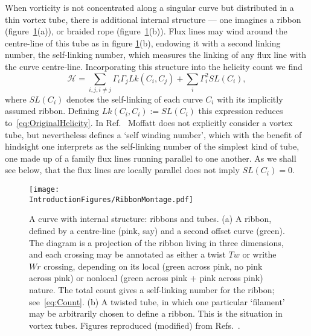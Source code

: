 When vorticity is not concentrated along a singular curve but distributed in a thin vortex tube, there is additional internal structure --- one imagines a ribbon (figure~\ref{fig:RibbonMontage}(a)), or braided rope (figure~\ref{fig:RibbonMontage}(b)). Flux lines may wind around the centre-line of this tube as in figure \ref{fig:RibbonMontage}(b), endowing it with a second linking number, the self-linking number, which measures the linking of any flux line with the curve centre-line. Incorporating this structure into the helicity count we find \citep{Moffat1992}
\begin{equation}
    \mathcal{H} = \sum_{i,j, i\neq j}\Gamma_i \Gamma_j  Lk(C_i,C_j) + \sum_{i} \Gamma_i^2 SL(C_i), 
    \label{eq:HelicityCount}
\end{equation}
where $SL(C_i)$ denotes the self-linking of each curve $C_i$ with its implicitly assumed ribbon. Defining $Lk(C_i,C_i) := SL(C_i)$ this expression reduces to~\eqref{eq:OriginalHelicity}. In Ref.~\citep{Moffatt1969} Moffatt does not explicitly consider a vortex tube, but nevertheless defines a `self winding number', which with the benefit of hindsight one interprets as the self-linking number of the simplest kind of tube, one made up of a family flux lines running parallel to one another. As we shall see below, that the flux lines are locally parallel does not imply $SL(C_i) = 0$.
\begin{figure}[htbp]
\centering
\texttt{[image: \\IntroductionFigures/RibbonMontage.pdf]}
\caption{A curve with internal structure: ribbons and tubes. (a) A ribbon, defined by a centre-line (pink, say) and a second offset curve (green). The diagram is a projection of the ribbon living in three dimensions, and each crossing may be annotated as either a twist $Tw$ or writhe $Wr$ crossing, depending on its local (green across pink, no pink across pink) or nonlocal (green across pink + pink across pink) nature. The total count gives a self-linking number for the ribbon; see~\eqref{eq:Count}. (b) A twisted tube, in which one particular `filament' may be arbitrarily chosen to define a ribbon. This is the situation in vortex tubes. Figures reproduced (modified) from Refs.~\citep{Dennis2005,Moffat1992}.}
\label{fig:RibbonMontage}
\end{figure}
